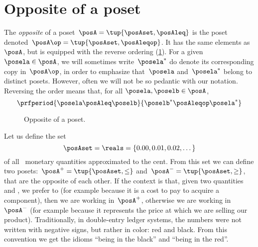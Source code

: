 
\section{Opposite of a poset}\label{sec:opposite-of-a-poset}

\begin{definition}
    \label{def:poset-opposite}
    The \emph{opposite} of a poset~$\posA=\tup{\posAset, \posAleq}$ is the poset denoted~$\posA\op=\tup{\posAset, \posAleqop}$.
    It has the same elements as~$\posA$, but is equipped with the reverse ordering (\cref{fig:poset-opposite}).
    For a given~$\posela \in \posA$, we will sometimes write~$\posela^*$ do denote its corresponding copy in~$\posA\op$, in order to emphasize that~$\posela$ and~$\posela^*$ belong to distinct posets.
    However, often we will not be so pedantic with our notation.
    Reversing the order means that, for all $\posela,\poselb \in \posA$,
    \begin{equation}
        \prfperiod{
            \posela \posAleq \poselb
        }{
            \poselb^* \posAleqop \posela^*
        }
    \end{equation}
\end{definition}

\begin{figure}[tbh]
    \centering
    \caption{
        Opposite of a poset.
    }
    \label{fig:poset-opposite}
\end{figure}

\begin{example}
    Let us define the set
    \begin{equation*}
        \posAset=\reals=\{0.00,0.01,0.02,\dots\}
    \end{equation*}
    of all \CHFneutral \ monetary quantities approximated to the cent.
    From this set we can define two posets:~$\posA^{+} = \tup{\posAset, \leq}$ and~$\posA^{-} = \tup{\posAset, \geq}$, that are the opposite of each other.
    If the context is that, given two quantities~\unit[1]{\CHFneutral} and \unit[2]{\CHFneutral}, we prefer \unit[1]{\CHFneutral} to \unit[2]{\CHFneutral} (for example because it is a cost to pay to acquire a component), then we are working in~$\posA^{+}$, otherwise we are working in~$\posA^{-}$ (for example because it represents the price at which we are selling our product).
    Traditionally, in double-entry ledger systems, the numbers were not written with negative signs, but rather in color: red and black.
    From this convention we get the idioms ``being in the black'' and ``being in the red''.
\end{example}
